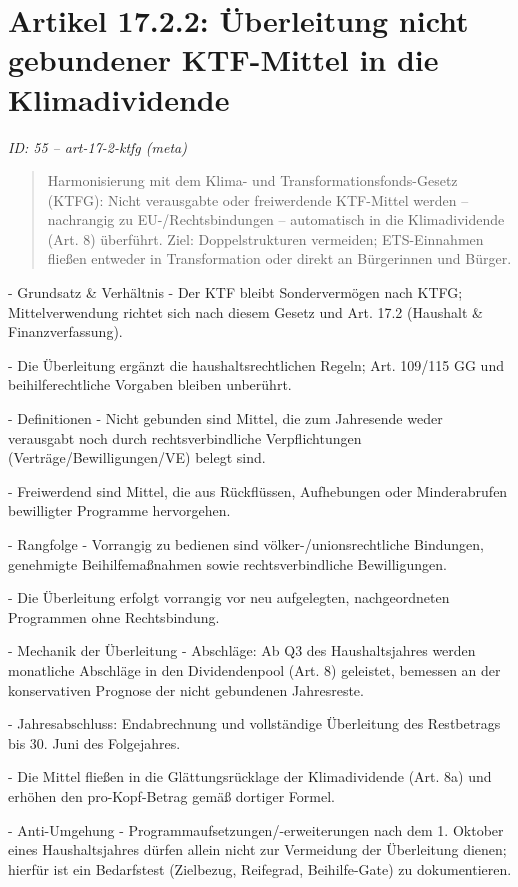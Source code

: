 \documentclass[12pt,a4paper]{scrartcl}
\begin{document}
\section[Artikel 17.2.2: Überleitung nicht gebundener KTF-Mittel in die Klimadividende]{Artikel 17.2.2: Überleitung nicht gebundener KTF-Mittel in die Klimadividende}
\noindent\textit{ID: 55 -- art-17-2-ktfg (meta)}

\begin{quote}
Harmonisierung mit dem Klima- und Transformationsfonds-Gesetz (KTFG): Nicht verausgabte oder freiwerdende KTF-Mittel werden -- nachrangig zu EU-/Rechtsbindungen -- automatisch in die Klimadividende (Art. 8) überführt. Ziel: Doppelstrukturen vermeiden; ETS-Einnahmen fließen entweder in Transformation oder direkt an Bürgerinnen und Bürger.
\end{quote}

- Grundsatz \& Verhältnis
- Der KTF bleibt Sondervermögen nach KTFG; Mittelverwendung richtet sich nach diesem Gesetz und Art. 17.2 (Haushalt \& Finanzverfassung).

- Die Überleitung ergänzt die haushaltsrechtlichen Regeln; Art. 109/115 GG und beihilferechtliche Vorgaben bleiben unberührt.

- Definitionen
- Nicht gebunden sind Mittel, die zum Jahresende weder verausgabt noch durch rechtsverbindliche Verpflichtungen (Verträge/Bewilligungen/VE) belegt sind.

- Freiwerdend sind Mittel, die aus Rückflüssen, Aufhebungen oder Minderabrufen bewilligter Programme hervorgehen.

- Rangfolge
- Vorrangig zu bedienen sind völker-/unionsrechtliche Bindungen, genehmigte Beihilfemaßnahmen sowie rechtsverbindliche Bewilligungen.

- Die Überleitung erfolgt vorrangig vor neu aufgelegten, nachgeordneten Programmen ohne Rechtsbindung.

- Mechanik der Überleitung
- Abschläge: Ab Q3 des Haushaltsjahres werden monatliche Abschläge in den Dividendenpool (Art. 8) geleistet, bemessen an der konservativen Prognose der nicht gebundenen Jahresreste.

- Jahresabschluss: Endabrechnung und vollständige Überleitung des Restbetrags bis 30. Juni des Folgejahres.

- Die Mittel fließen in die Glättungsrücklage der Klimadividende (Art. 8a) und erhöhen den pro-Kopf-Betrag gemäß dortiger Formel.

- Anti-Umgehung
- Programmaufsetzungen/-erweiterungen nach dem 1. Oktober eines Haushaltsjahres dürfen allein nicht zur Vermeidung der Überleitung dienen; hierfür ist ein Bedarfstest (Zielbezug, Reifegrad, Beihilfe-Gate) zu dokumentieren.
\end{document}
